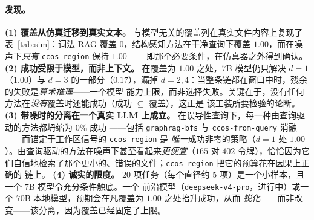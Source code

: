 \documentclass[11pt]{ctexart}
\newcommand{\code}[1]{\texttt{#1}}
\begin{document}
\paragraph{发现。}
\textbf{(1) 覆盖从仿真迁移到真实文本。} 与模型无关的覆盖列在真实文件内容上复现了表~\ref{tab:sim}：词法 RAG
覆盖 $0$，结构感知方法在干净查询下覆盖 $1.00$，而在噪声下\emph{只有} \code{ccos-region} 保持 $1.00$——
即那个必要条件，在仿真器之外得到确认。
\textbf{(2) 成功受限于模型，而非上下文。} 在覆盖为 $1.00$ 之处，$7$B 模型仍只解决 $d{=}1$（$1.00$）与
$d{=}3$ 的一部分（$0.17$），漏掉 $d{=}2,4$：当整条链都在窗口中时，残余的失败是\emph{算术推理}——一个模型
能力上限，而非选择失败。关键在于，没有任何方法在\emph{没有}覆盖时还能成功（成功 $\subseteq$ 覆盖），这正是
该工装所要检验的论断。
\textbf{(3) 带噪时的分离在一个真实 LLM 上成立。} 在误导性查询下，每一种由查询驱动的方法都坍缩为 $0\%$ 成功
——包括 \code{graphrag-bfs} 与 \code{ccos-from-query} 消融——而锚定于工作区信号的 \code{ccos-region} 是
\emph{唯一}成功非零的策略（$d{=}1$ 处 $1.00$）。由查询驱动的方法在噪声下甚至看起来\emph{更便宜}（$165$ 对
$402$ 令牌），恰恰因为它们自信地检索了那个更小的、错误的文件；\code{ccos-region} 把它的预算花在因果上正确的
链上。
\textbf{(4) 诚实的限度。} $20$ 项任务（每个直径约 $5$ 项）是一个小样本，且一个 $7$B 模型令充分条件触底。一个
前沿模型（\code{deepseek-v4-pro}，进行中）或一个 $70$B 本地模型，预期会在凡覆盖为 $1.00$ 之处抬升成功，从而
\emph{锐化}——而非改变——该分离，因为覆盖已经固定了上限。
\end{document}
